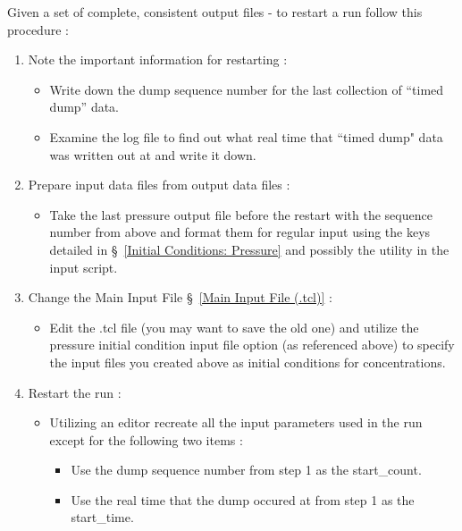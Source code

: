 Given a set of complete, consistent output files - to restart a run follow
this procedure :

\begin{enumerate}
   \item Note the important information for restarting :
   \begin{itemize}
      \item Write down the dump sequence number for the last collection of
           ``timed dump'' data.
      \item Examine the log file to find out what real time that ``timed dump"
            data was written out at and write it down.
   \end{itemize}
   \item Prepare input data files from output data files :
   \begin{itemize}
      \item Take the last pressure output file before the restart with the sequence number
            from above and format them for regular input using the keys detailed in \S~\ref{Initial Conditions: Pressure} and possibly the  utility in the input script.
   \end{itemize}
   \item Change the Main Input File \S~\ref{Main Input File (.tcl)} :
   \begin{itemize}
      \item Edit the .tcl file (you may want to save the old one) and
            utilize the pressure initial condition input file option (as referenced above) to specify
             the input files you created above as initial conditions
            for concentrations.
   \end{itemize}
   \item Restart the run :
   \begin{itemize}
      \item Utilizing an editor recreate all the input parameters used
            in the run except for the following two items :
            \begin{itemize}
               \item Use the dump sequence number from step 1
                     as the start\_count.
               \item Use the real time that the dump occured at from step 1
                     as the start\_time.
            \end{itemize}
   \end{itemize}
\end{enumerate}

